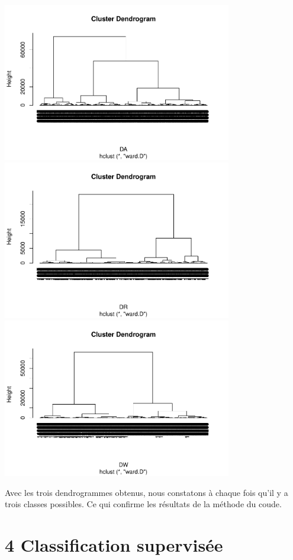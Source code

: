 \documentclass[
]{article}
\begin{document}
\begin{center}
	\includegraphics[width=10cm]{repport_files/figure-latex/unnamed-chunk-15-1.pdf}
	\includegraphics[width=10cm]{repport_files/figure-latex/unnamed-chunk-15-2.pdf}
	\includegraphics[width=10cm]{repport_files/figure-latex/unnamed-chunk-15-3.pdf} 
\end{center}

Avec les trois dendrogrammes obtenus, nous constatons à chaque fois qu'il y a
trois classes possibles. Ce qui confirme les résultats de la méthode du
coude.

\newpage
\hypertarget{classification-supervisuxe9e}{%
\section{4 Classification
supervisée}\label{classification-supervisuxe9e}}
\end{document}
